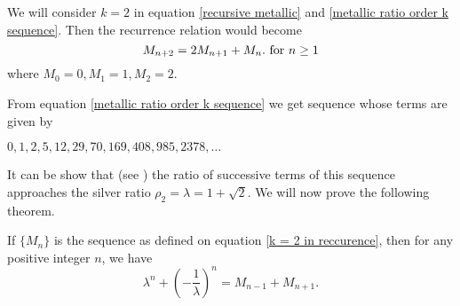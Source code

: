 \documentclass{rmutt-seminar}
\begin{document}
\par
\noindent We will consider $ k = 2 $ in equation \eqref{recursive metallic} and \eqref{metallic ratio order k sequence}. Then the recurrence relation would become 
\begin{equation}\label{k = 2 in reccurence}
	 M_{n+2} = 2M_{n+1} + M_n.
	 \textnormal{ for } n \geq 1
\end{equation}  
where $M_0=0, M_1=1, M_2=2.$
\newline

From equation \eqref{metallic ratio order k sequence} we get sequence whose terms are given by 
\begin{center}
	$0,1,2,5,12,29,70,169,408,985,2378,\ldots $ 
\end{center}

It can be show that (see \cite{R20}) the ratio of successive terms of this sequence approaches the silver ratio
$ \rho_{2} = \lambda = 1 + \sqrt{2} $. We will now prove the following theorem.
\begin{theorem}\label{silver ratio theorem}
If $\bigl\{ M_n \bigr\}$ is the sequence as defined on equation \eqref{k = 2 in reccurence}, then for any positive integer $ n $, we have
\begin{equation}\label{silver ratio recursive}
	 \lambda^n + \left(-\frac{1}{\lambda}\right)^n = M_{n-1} + M_{n+1}.  
\end{equation}
\end{theorem}
\end{document}
